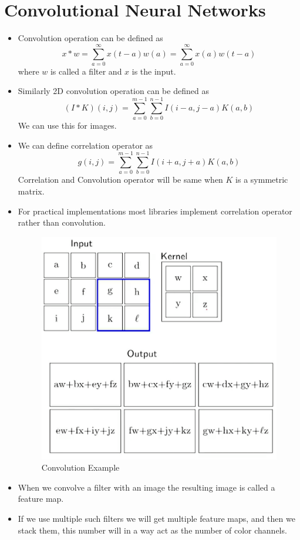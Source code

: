 \documentclass[a4paper]{article}
\begin{document}
\section{Convolutional Neural Networks}
\begin{itemize}
    \item Convolution operation can be defined as
    \begin{equation*}
        x\ast w=\sum_{a=0}^{\infty}x(t-a)w(a)=\sum_{a=0}^{\infty}x(a)w(t-a)
    \end{equation*}
    where $w$ is called a filter and $x$ is the input.
    \item Similarly 2D convolution operation can be defined as
    \begin{equation*}
        (I\ast K)(i,j)=\sum_{a=0}^{m-1}\sum_{b=0}^{n-1}I(i-a,j-a)K(a,b)
    \end{equation*}
    We can use this for images.
    \item We can define correlation operator as
    \begin{equation*}
        g(i,j)=\sum_{a=0}^{m-1}\sum_{b=0}^{n-1}I(i+a,j+a)K(a,b)
    \end{equation*}
    Correlation and Convolution operator will be same when $K$ is a symmetric matrix.
    \item For practical implementations most libraries implement correlation operator rather than convolution.
    \begin{figure}[H]
        \centering
        \includegraphics[width=0.5\linewidth]{Degree//static/DL_convolution_example.png}
        \caption{Convolution Example}
    \end{figure}
    \item When we convolve a filter with an image the resulting image is called a feature map.
    \item If we use multiple such filters we will get multiple feature maps, and then we stack them, this number will in a way act as the number of color channels.

\end{itemize}
\end{document}
